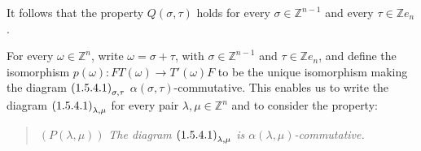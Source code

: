 It follows that the property $Q(\sigma,\tau)$ holds for every
$\sigma\in\mathbb Z^{n-1}$ and every $\tau\in\mathbb Z e_n$.

For every $\omega\in\mathbb Z^n$, write
$\omega=\sigma+\tau$, with $\sigma\in\mathbb Z^{n-1}$ and
$\tau\in\mathbb Z e_n$, and define the isomorphism
$p(\omega)\colon FT(\omega)\longrightarrow T'(\omega)F$ to be the
unique isomorphism making the diagram
$\textup{(1.5.4.1)}_{\sigma,\tau}$
$\alpha(\sigma,\tau)$-commutative. This enables us to write the
diagram $\textup{(1.5.4.1)}_{\lambda,\mu}$ for every pair
$\lambda,\mu\in\mathbb Z^n$ and to consider the property:

\begin{quote}
  \noindent\textup{$(P(\lambda,\mu))$}\quad
  \emph{The diagram $\textup{(1.5.4.1)}_{\lambda,\mu}$ is
  $\alpha(\lambda,\mu)$-commutative.}
\end{quote}
